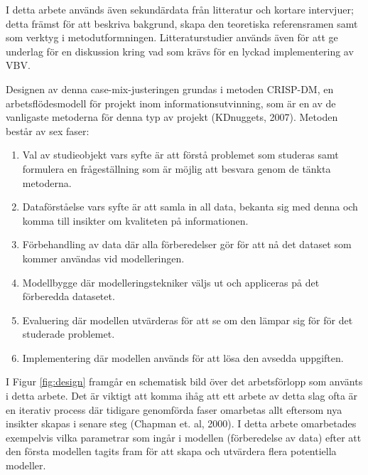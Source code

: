I detta arbete används även sekundärdata från litteratur och kortare intervjuer; detta främst för att beskriva bakgrund, skapa den teoretiska referensramen samt som verktyg i metodutformningen. Litteraturstudier används även för att ge underlag för en diskussion kring vad som krävs för en lyckad implementering av VBV.

Designen av denna case-mix-justeringen grundas i metoden CRISP-DM, en arbetsflödesmodell för projekt inom informationsutvinning, som är en av de vanligaste metoderna för denna typ av projekt (KDnuggets, 2007). Metoden består av sex faser:

\begin{enumerate}
  \item Val av studieobjekt vars syfte är att förstå problemet som studeras samt formulera en frågeställning som är möjlig att besvara genom de tänkta metoderna.
  \item Dataförståelse vars syfte är att samla in all data, bekanta sig med denna och komma till insikter om kvaliteten på informationen.
  \item Förbehandling av data där alla förberedelser gör för att nå det dataset som kommer användas vid modelleringen.
  \item Modellbygge där modelleringstekniker väljs ut och appliceras på det förberedda datasetet.
  \item Evaluering där modellen utvärderas för att se om den lämpar sig för för det studerade problemet.
  \item Implementering där modellen används för att lösa den avsedda uppgiften.
\end{enumerate}

I Figur \ref{fig:design} framgår en schematisk bild över det arbetsförlopp som använts i detta arbete. Det är viktigt att komma ihåg att ett arbete av detta slag ofta är en iterativ process där tidigare genomförda faser omarbetas allt eftersom nya insikter skapas i senare steg (Chapman et. al, 2000). I detta arbete omarbetades exempelvis vilka parametrar som ingår i modellen (förberedelse av data) efter att den första modellen tagits fram för att skapa och utvärdera flera potentiella modeller.


